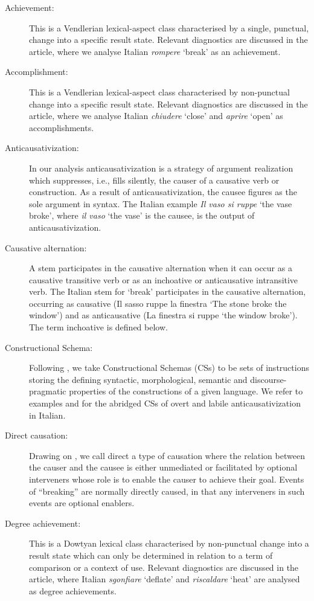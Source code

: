 \documentclass[output=paper,colorlinks,citecolor=brown
]{langscibook}
\begin{document}
\begin{description}\sloppy
\item[Achievement:]  This is a Vendlerian   lexical-aspect class characterised by a single, punctual, change into a specific   result state. Relevant diagnostics are discussed in the article, where we   analyse Italian \textit{rompere} ‘break’ as an achievement.   
\item[Accomplishment:]  This is a Vendlerian   lexical-aspect class characterised by non-punctual change into a specific result   state. Relevant diagnostics are discussed in the article, where we analyse Italian   \textit{chiudere} ‘close’ and \textit{aprire} ‘open’ as accomplishments. 
\item[Anticausativization:]  In our analysis anticausativization   is a strategy of argument realization which suppresses, i.e., fills   silently, the causer of a causative verb or construction. As a result of anticausativization,   the causee figures as the sole argument in syntax. The Italian example \textit{Il   vaso si ruppe} ‘the vase broke’, where \textit{il vaso} ‘the vase’ is the   causee, is the output of anticausativization. 
\item[Causative   alternation:]  A stem participates in the causative   alternation when it can occur as a causative transitive verb or as an   inchoative or anticausative intransitive verb. The Italian stem for ‘break’   participates in the causative alternation, occurring as causative (Il sasso   ruppe la finestra ‘The stone broke the window’) and as anticausative (La   finestra si ruppe ‘the window broke’). The term inchoative   is defined below. 
\item[Constructional   Schema:]  Following \citet{vanvalin2023principles}, we   take Constructional Schemas (CSs) to be sets of instructions storing   the defining syntactic, morphological, semantic and discourse-pragmatic   properties of the constructions of a given language. We refer to examples    and  for the abridged CSs of overt and labile anticausativization in   Italian.   
\item[Direct   causation:]  Drawing on \citet{wolff2003direct}, we call direct   a type of causation where the relation between the causer and the causee is   either unmediated or facilitated by optional interveners whose role is to   enable the causer to achieve their goal. Events of “breaking” are normally   directly caused, in that any interveners in such events are optional   enablers. 
\item[Degree   achievement:]  This is a Dowtyan lexical class   characterised by non-punctual change into a result state which can only be   determined in relation to a term of comparison or a context of use. Relevant   diagnostics are discussed in the article, where Italian \textit{sgonfiare}   ‘deflate’ and \textit{riscaldare} ‘heat’ are analysed as degree achievements.                 

\end{description}
\end{document}
